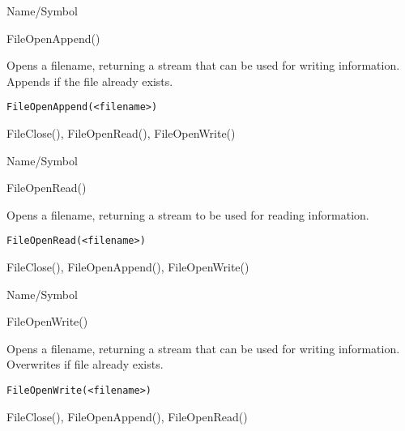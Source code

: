 \rl




\begin{desc}{Name/Symbol}
\item[Name/Symbol]	FileOpenAppend()

\item[Description]	Opens a filename, returning  a stream that can be used for 
		writing information.  Appends if the file already exists.

\item[Usage]
\begin{verbatim}
FileOpenAppend(<filename>)
\end{verbatim}

\item[Example]	

\item[See Also]	FileClose(), FileOpenRead(), FileOpenWrite()
\end{desc}

\rl



\begin{desc}{Name/Symbol}
\item[Name/Symbol]	FileOpenRead()

\item[Description]  	Opens a filename, returning  a stream to be used 
		for reading information.

\item[Usage]
\begin{verbatim}
FileOpenRead(<filename>)
\end{verbatim}

\item[Example]	

\item[See Also]	FileClose(), FileOpenAppend(), FileOpenWrite()
\end{desc}

\rl


\begin{desc}{Name/Symbol}
\item[Name/Symbol]	FileOpenWrite()

\item[Description]	Opens a filename, returning a stream  that can be used for writing information.  Overwrites if file already exists.

\item[Usage]
\begin{verbatim}
FileOpenWrite(<filename>)
\end{verbatim}

\item[Example]	

\item[See Also]	FileClose(), FileOpenAppend(), FileOpenRead()
\end{desc}

